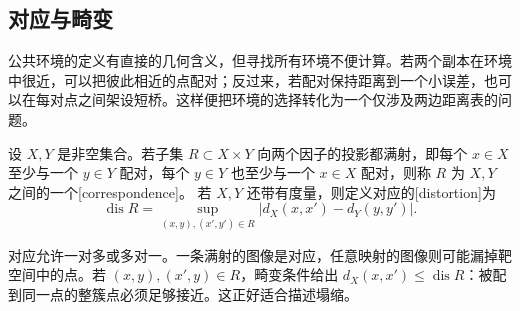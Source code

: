 \subsection{对应与畸变}
\label{g3:subsec:1002:02}

公共环境的定义有直接的几何含义，但寻找所有环境不便计算。若两个副本在环境中很近，可以把彼此相近的点配对；反过来，若配对保持距离到一个小误差，也可以在每对点之间架设短桥。这样便把环境的选择转化为一个仅涉及两边距离表的问题。

\begin{definition}\label{g3:def:metric-correspondence}
	设 \(X,Y\) 是非空集合。若子集 \(R\subset X\times Y\) 向两个因子的投影都满射，即每个 \(x\in X\) 至少与一个 \(y\in Y\) 配对，每个 \(y\in Y\) 也至少与一个 \(x\in X\) 配对，则称 \(R\) 为 \(X,Y\) 之间的一个[correspondence]。
	若 \(X,Y\) 还带有度量，则定义对应的[distortion]为
	\begin{equation}\label{g3:eq:correspondence-distortion}
		\operatorname{dis}R
		=\sup_{(x,y),(x',y')\in R}
		\bigl|d_X(x,x')-d_Y(y,y')\bigr|.
	\end{equation}
\end{definition}

对应允许一对多或多对一。一条满射的图像是对应，任意映射的图像则可能漏掉靶空间中的点。若 \((x,y),(x',y)\in R\)，畸变条件给出 \(d_X(x,x')\le\operatorname{dis}R\)：被配到同一点的整簇点必须足够接近。这正好适合描述塌缩。

